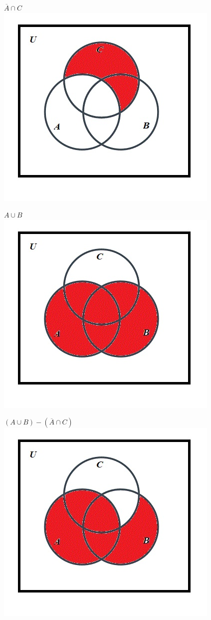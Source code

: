 \documentclass[10pt]{article}
\begin{document}
$\overline{A} \cap C$\\
\includegraphics[scale=0.55]{35}

$A \cup B$\\
\includegraphics[scale=0.55]{32}

$(A \cup B) - (\overline{A} \cap C)$\\
\includegraphics[scale=0.55]{33}
\end{document}
